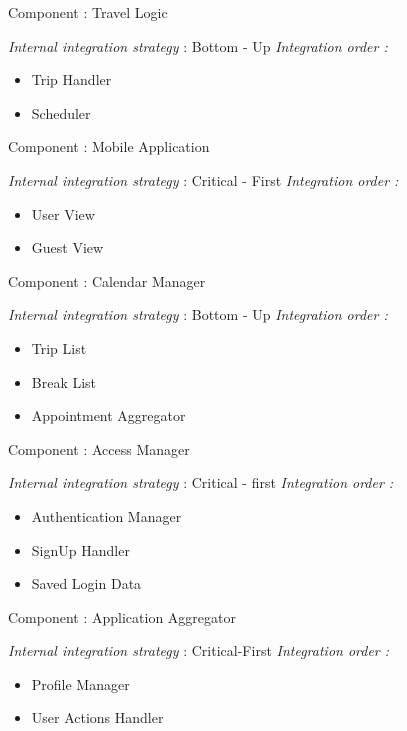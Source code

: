 Component : Travel Logic

\textit{Internal integration strategy} : Bottom - Up
\textit{Integration order :}
	\begin{itemize}	
		\item Trip Handler
		\item Scheduler
	\end{itemize}
	
Component : Mobile Application

\textit{Internal integration strategy} : Critical - First
\textit{Integration order :}
	\begin{itemize}
		\item User View
		\item Guest View
	\end{itemize}
	
Component : Calendar Manager

\textit{Internal integration strategy} : Bottom - Up
\textit{Integration order :}
	\begin{itemize}
		\item Trip List
		\item Break List
		\item Appointment Aggregator
	\end{itemize}

Component : Access Manager

\textit{Internal integration strategy} : Critical - first
\textit{Integration order :}
	\begin{itemize}
		\item Authentication Manager
		\item SignUp Handler
		\item Saved Login Data
	\end{itemize}
		
Component : Application Aggregator

\textit{Internal integration strategy} : Critical-First
\textit{Integration order :}
	\begin{itemize}
		\item Profile Manager
		\item User Actions Handler
\end{itemize}
	

	

	





	
